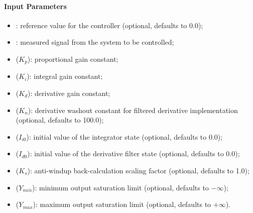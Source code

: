 \paragraph{Input Parameters}
\begin{itemize}
    \item {}: reference value for the controller (optional, defaults to 0.0);
    \item {}: measured signal from the system to be controlled;
    \item {} ($K_p$): proportional gain constant;
    \item {} ($K_i$): integral gain constant;
    \item {} ($K_d$): derivative gain constant;
    \item {} ($K_n$): derivative washout constant for filtered derivative implementation (optional, defaults to 100.0);
    \item {} ($I_{i0}$): initial value of the integrator state (optional, defaults to 0.0);
    \item {} ($I_{d0}$): initial value of the derivative filter state (optional, defaults to 0.0);
    \item {} ($K_s$): anti-windup back-calculation scaling factor (optional, defaults to 1.0);
    \item {} ($Y_{min}$): minimum output saturation limit (optional, defaults to $-\infty$);
    \item {} ($Y_{max}$): maximum output saturation limit (optional, defaults to $+\infty$).
\end{itemize}


